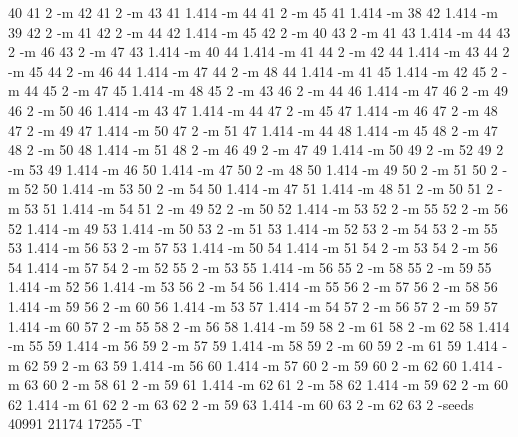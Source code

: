 \documentclass[12pt]{article}
\begin{document}
40 41 2 -m 42 41 2 -m 43 41 1.414 -m 44 41 2 -m 45 41 1.414 -m 38 42 1.414 -m 39 42 2 -m 41 42 2 -m 44 42 1.414 -m 45 42 2 -m 40 43 2 -m 41 43 1.414 -m 44 43 2 -m 46 43 2 -m 47 43 1.414 -m 40 44 1.414 -m 41 44 2 -m 42 44 1.414 -m 43 44 2 -m 45 44 2 -m 46 44 1.414 -m 47 44 2 -m 48 44 1.414 -m 41 45 1.414 -m 42 45 2 -m 44 45 2 -m 47 45 1.414 -m 48 45 2 -m 43 46 2 -m 44 46 1.414 -m 47 46 2 -m 49 46 2 -m 50 46 1.414 -m 43 47 1.414 -m 44 47 2 -m 45 47 1.414 -m 46 47 2 -m 48 47 2 -m 49 47 1.414 -m 50 47 2 -m 51 47 1.414 -m 44 48 1.414 -m 45 48 2 -m 47 48 2 -m 50 48 1.414 -m 51 48 2 -m 46 49 2 -m 47 49 1.414 -m 50 49 2 -m 52 49 2 -m 53 49 1.414 -m 46 50 1.414 -m 47 50 2 -m 48 50 1.414 -m 49 50 2 -m 51 50 2 -m 52 50 1.414 -m 53 50 2 -m 54 50 1.414 -m 47 51 1.414 -m 48 51 2 -m 50 51 2 -m 53 51 1.414 -m 54 51 2 -m 49 52 2 -m 50 52 1.414 -m 53 52 2 -m 55 52 2 -m 56 52 1.414 -m 49 53 1.414 -m 50 53 2 -m 51 53 1.414 -m 52 53 2 -m 54 53 2 -m 55 53 1.414 -m 56 53 2 -m 57 53 1.414 -m 50 54 1.414 -m 51 54 2 -m 53 54 2 -m 56 54 1.414 -m 57 54 2 -m 52 55 2 -m 53 55 1.414 -m 56 55 2 -m 58 55 2 -m 59 55 1.414 -m 52 56 1.414 -m 53 56 2 -m 54 56 1.414 -m 55 56 2 -m 57 56 2 -m 58 56 1.414 -m 59 56 2 -m 60 56 1.414 -m 53 57 1.414 -m 54 57 2 -m 56 57 2 -m 59 57 1.414 -m 60 57 2 -m 55 58 2 -m 56 58 1.414 -m 59 58 2 -m 61 58 2 -m 62 58 1.414 -m 55 59 1.414 -m 56 59 2 -m 57 59 1.414 -m 58 59 2 -m 60 59 2 -m 61 59 1.414 -m 62 59 2 -m 63 59 1.414 -m 56 60 1.414 -m 57 60 2 -m 59 60 2 -m 62 60 1.414 -m 63 60 2 -m 58 61 2 -m 59 61 1.414 -m 62 61 2 -m 58 62 1.414 -m 59 62 2 -m 60 62 1.414 -m 61 62 2 -m 63 62 2 -m 59 63 1.414 -m 60 63 2 -m 62 63 2 -seeds 40991 21174 17255 -T
\end{document}
